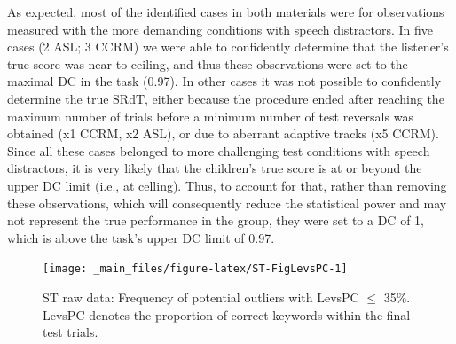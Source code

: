 \documentclass[a4paper, twoside]{templates/ociamthesis}
\begin{document}
As expected, most of the identified cases in both materials were for observations measured with the more demanding conditions with speech distractors. In five cases (2 ASL; 3 CCRM) we were able to confidently determine that the listener's true score was near to ceiling, and thus these observations were set to the maximal DC in the task (0.97). In other cases it was not possible to confidently determine the true SRdT, either because the procedure ended after reaching the maximum number of trials before a minimum number of test reversals was obtained (x1 CCRM, x2 ASL), or due to aberrant adaptive tracks (x5 CCRM). Since all these cases belonged to more challenging test conditions with speech distractors, it is very likely that the children's true score is at or beyond the upper DC limit (i.e., at celling). Thus, to account for that, rather than removing these observations, which will consequently reduce the statistical power and may not represent the true performance in the group, they were set to a DC of 1, which is above the task's upper DC limit of 0.97.\\

\begin{figure}
\texttt{[image: \_main\_files/figure-latex/ST-FigLevsPC-1]} \caption{ST raw data: Frequency of potential outliers with LevsPC $\leq$ 35\%. LevsPC denotes the proportion of correct keywords within the final test trials.}\label{fig:ST-FigLevsPC}
\end{figure}
\end{document}
